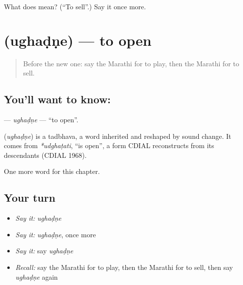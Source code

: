 \begin{tcolorbox}[breakable,colback=teal!4,colframe=teal!35!black,title={Before you move on}]
What does  mean? (\textquotedblleft{}To sell\textquotedblright{}.) Say it once more.
\end{tcolorbox}
\section[\texorpdfstring{\mr{उघडणे} (ughaḍṇe)}{उघडणे (ughaḍṇe)}]{ (ughaḍṇe) — to open}

\label{lesson:MR-C78-ughadne}



\begin{quote}
Before the new one: say the Marathi for to play, then the Marathi for to sell.
\end{quote}

\subsection*{You'll want to know: }
\textbf{} — \emph{ughaḍṇe} — \textquotedblleft{}to open\textquotedblright{}.

\begin{cousinweb}
\textbf{} (\emph{ughaḍṇe}) is a tadbhava, a word inherited and reshaped by sound change. It comes from \emph{*udghaṭati}, \textquotedblleft{}is open\textquotedblright{}, a form CDIAL reconstructs from its descendants (CDIAL 1968).
\end{cousinweb}

\begin{grammarlens}[title={What you've built}]
One more word for this chapter.
\end{grammarlens}

\subsection*{Your turn}
\begin{itemize}
\raggedright
  \item \emph{Say it:} \emph{ughaḍṇe}
  \item \emph{Say it:} \emph{ughaḍṇe}, once more
  \item \emph{Say it:} say \emph{ughaḍṇe}
  \item \emph{Recall:} say the Marathi for to play, then the Marathi for to sell, then say \emph{ughaḍṇe} again
\end{itemize}

